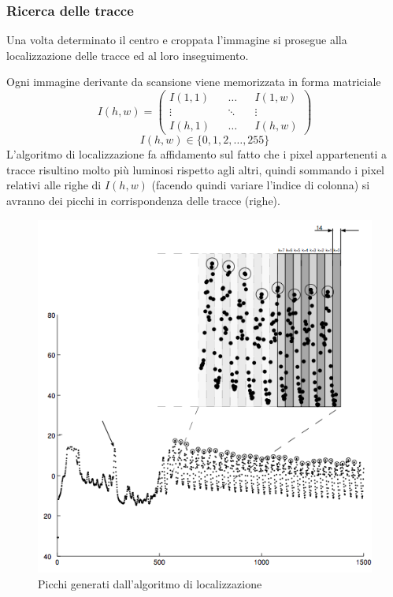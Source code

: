 \subsubsection{Ricerca delle tracce}
Una volta determinato il centro e croppata l'immagine si prosegue alla localizzazione delle tracce ed al loro inseguimento.

Ogni immagine derivante da scansione viene memorizzata in forma matriciale 
$$I(h,w) = \begin{pmatrix} 
	I(1,1) && \ldots && I(1,w) \\
	\vdots && \ddots && \vdots \\
	I(h,1) && \ldots && I(h,w)
\end{pmatrix}$$  $$I(h,w) \in \{0, 1,2,\dots, 255\}$$
L'algoritmo di localizzazione fa affidamento sul fatto che i pixel appartenenti a tracce risultino molto pi\`u luminosi rispetto agli altri, quindi sommando i pixel relativi alle righe di $I(h,w)$ (facendo quindi variare l'indice di colonna) si avranno dei picchi in corrispondenza delle tracce (righe).
\begin{figure}[h!t]
\begin{center}
\includegraphics[scale=0.3]{./img/track-detection.png}
\caption{Picchi generati dall'algoritmo di localizzazione}
\end{center}
\end{figure}
